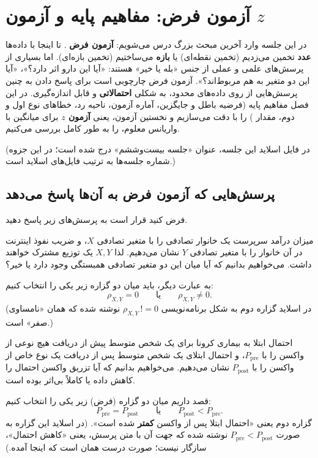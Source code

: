 \chapter{آزمون فرض: مفاهیم پایه و آزمون $z$}

در این جلسه وارد آخرین مبحث بزرگ درس می‌شویم: \textbf{آزمون فرض }. تا اینجا با داده‌ها \textbf{عدد} تخمین می‌زدیم (تخمین نقطه‌ای) یا \textbf{بازه} می‌ساختیم (تخمین بازه‌ای). اما بسیاری از پرسش‌های علمی و عملی از جنس «بله یا خیر» هستند: «آیا این دارو اثر دارد؟»، «آیا این دو متغیر به هم مربوط‌اند؟». آزمون فرض چارچوبی است برای پاسخ دادن به چنین پرسش‌هایی از روی داده‌های محدود، به شکلی \textbf{احتمالاتی} و قابل اندازه‌گیری. در این فصل مفاهیم پایه (فرضیه باطل و جایگزین، آماره آزمون، ناحیه رد، خطاهای نوع اول و دوم، مقدار ) را با دقت می‌سازیم و نخستین آزمون، یعنی \textbf{آزمون $z$} برای میانگین با واریانس معلوم، را به طور کامل بررسی می‌کنیم.

(در فایل اسلاید این جلسه، عنوان «جلسه بیست‌وششم» درج شده است؛ در این جزوه شماره جلسه‌ها به ترتیب فایل‌های اسلاید است.)

\section{پرسش‌هایی که آزمون فرض به آن‌ها پاسخ می‌دهد}
فرض کنید قرار است به پرسش‌های زیر پاسخ دهید.

\begin{question}
میزان درآمد سرپرست یک خانوار تصادفی را با متغیر تصادفی $X$، و ضریب نفوذ اینترنت در آن خانوار را با متغیر تصادفی $Y$ نشان می‌دهیم. لذا $X,Y$ یک توزیع مشترک خواهند داشت. می‌خواهیم بدانیم که آیا میان این دو متغیر تصادفی همبستگی  وجود دارد یا خیر؟
\begin{answer}
به عبارت دیگر، باید میان دو گزاره زیر یکی را انتخاب کنیم:
\[
\rho_{X,Y}=0\qquad\text{یا}\qquad\rho_{X,Y}\neq0 .
\]
(در اسلاید گزاره دوم به شکل برنامه‌نویسی $\rho_{X,Y}\,!\!=0$ نوشته شده که همان «نامساوی صفر» است.)
\end{answer}
\end{question}

\begin{question}
احتمال ابتلا به بیماری کرونا برای یک شخص متوسط پیش از دریافت هیچ نوعی از واکسن را با $P_{\text{pre}}$، و احتمال ابتلای یک شخص متوسط پس از دریافت یک نوع خاص از واکسن را با $P_{\text{post}}$ نشان می‌دهیم. می‌خواهیم بدانیم که آیا تزریق واکسن احتمال را کاهش داده یا کاملاً بی‌اثر بوده است.
\begin{answer}
قصد داریم میان دو گزاره (فرض) زیر یکی را انتخاب کنیم:
\[
P_{\text{pre}}=P_{\text{post}}\qquad\text{یا}\qquad P_{\text{post}}<P_{\text{pre}} .
\]
گزاره دوم یعنی «احتمال ابتلا پس از واکسن \textbf{کمتر} شده است». (در اسلاید این گزاره به صورت $P_{\text{pre}}<P_{\text{post}}$ نوشته شده که جهت آن با متن پرسش، یعنی «کاهش احتمال»، سازگار نیست؛ صورت درست همان است که اینجا آمده.)
\end{answer}
\end{question}

